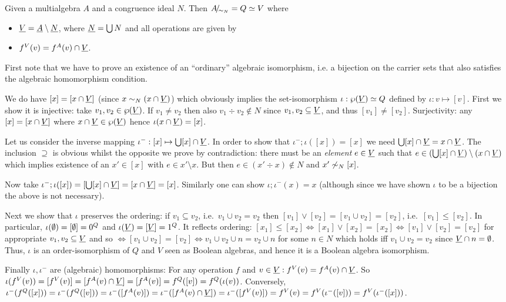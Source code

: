 \documentclass[10pt]{article}
\begin{document}
\begin{Fact}
Given a multialgebra $A$ and a congruence ideal $N$. 
Then $A\!{\textstyle /}\!_{{\sim_{N}}}=Q\mathrel{\simeq} V$ where 
%
\begin{itemize}\MyLPar
\item 
$\underline {V}=\underline {A}\setminus\underline {N}$, where $\underline {N}=\bigcup N$
and all operations are given by
\item 
$f^V(v)=f^A(v)\cap\underline {V}$.
\end{itemize}
\end{Fact}

\begin{Proof}
First note that we have to prove an existence of an ``ordinary''
algebraic isomorphism, i.e. a bijection on the carrier sets that also
satisfies the algebraic homomorphism condition.

We do have $[x]=[x\cap\underline {V}]$ (since $x\sim_N (x\cap\underline {V})$)
which obviously implies the set-isomorphism $\iota: \wp(\underline {V})
\mathrel{\simeq} Q$ defined by $\iota:v\mapsto [v]$. First we show it is
injective: take $v_1,v_2\in\wp(\underline {V})$. If $v_1\not= v_2$ then
also $v_1\div v_2\not\in N$ since $v_1,v_2\subseteq\underline {V}$, and thus
$[v_1]\not=[v_2]$. Surjectivity: any $[x] = [x\cap \underline {V}]$ where
$x\cap\underline {V} \in \wp(\underline {V})$ hence $\iota(x\cap\underline {V}) = [x]$.

Let us consider the inverse mapping $\iota^- : [x] \mapsto \bigcup [x]
\cap \underline {V}$. In order to show that $\iota^-;\iota([x]) = [x]$ we
need $\bigcup [x]\cap\underline {V} = x\cap\underline {V}$. The inclusion $\supseteq$
 is obvious whilst the opposite we prove by contradiction: there
must be an {\em element\/} $e \in \underline {V}$ such that $e \in (\bigcup
[x]\cap\underline {V}) \setminus (x\cap\underline {V})$ which implies existence of an $x'
\in [x]$ with $e \in x'\setminus x$. But then $e \in (x'\div x) \not\in N$ and
$x' \not\sim_N [x]$. 

Now take $\iota^-;\iota([x]) = [\bigcup [x]\cap \underline {V}] =
[x\cap\underline {V}] = [x]$. Similarly one can show $\iota;\iota^-(x)=x$
(although since we have shown $\iota$ to be a bijection the above is
not necessary).

Next we show that $\iota$ preserves the ordering: if $v_1\subseteq
v_2$, i.e.\ $v_1\cup v_2 = v_2$ then $[v_1]\vee [v_2]= [v_1\cup
v_2]=[v_2]$, i.e.\ $[v_1]\leq [v_2]$. In particular,
$\iota(\emptyset)=[\emptyset]=0^Q$ and $\iota(\underline {V})=[\underline {V}]=1^Q$.  It
reflects ordering: $[x_1]\leq [x_2]\iff [x_1]\vee [x_2]=[x_2]\iff
[v_1]\vee[v_2]=[v_2]$ for appropriate $v_1,v_2\subseteq\underline {V}$ and
so $\iff [v_1\cup v_2]=[v_2]\iff v_1\cup v_2\cup n = v_2\cup n$ for
some $n\in N$ which holds iff $v_1\cup v_2=v_2$ since $\underline {V}\cap
n=\emptyset$.  Thus, $\iota$ is an order-isomorphism of $Q$ and $V$ seen as
Boolean algebras, and hence it is a Boolean algebra isomorphism.

Finally $\iota, \iota^-$ are (algebraic) homomorphisms: For any
operation $f$ and $v\in\underline {V}: f^V(v)=f^A(v)\cap \underline {V}$.  So
$\iota(f^V(v))=[f^V(v)]=[f^A(v)\cap\underline {V}]=
[f^A(v)]=f^Q([v])=f^Q(\iota(v))$.  Conversely,
$\iota^-(f^Q([x]))=\iota^-(f^Q([v]))= \iota^-([f^A(v)])=
\iota^-([f^A(v)\cap\underline {V}]) = \iota^-([f^V(v)])=
f^V(v)=f^V(\iota^-([v])) = f^V(\iota^-([x]))$.
\end{Proof}
\end{document}
